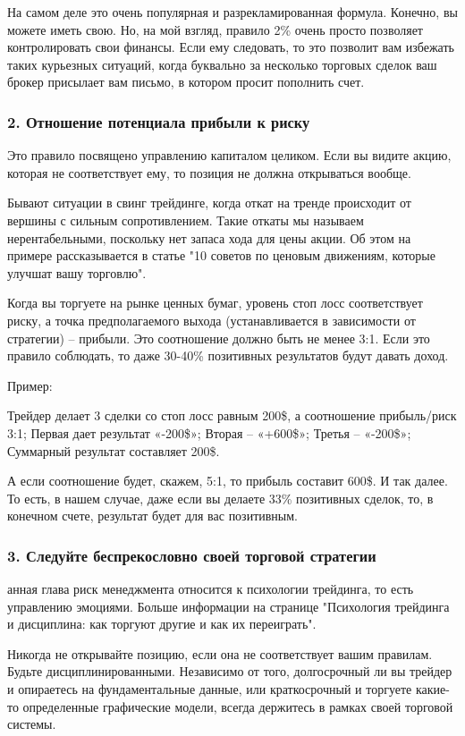 \documentclass{book}
\begin{document}
На самом деле это очень популярная и разрекламированная
формула. Конечно, вы можете иметь свою. Но, на мой взгляд, правило 2\% очень просто позволяет контролировать свои финансы. Если ему следовать, то это позволит вам избежать таких курьезных ситуаций, когда буквально за несколько торговых сделок ваш брокер присылает вам письмо, в котором просит пополнить счет.

\subsubsection{2. Отношение потенциала прибыли к риску}

Это правило посвящено управлению капиталом целиком. Если вы видите акцию, которая не соответствует ему, то позиция не должна открываться вообще.

Бывают ситуации в свинг трейдинге, когда откат на тренде происходит от вершины с сильным сопротивлением. Такие откаты мы называем нерентабельными, поскольку нет запаса хода для цены акции. Об этом на примере рассказывается в статье "10 советов по ценовым движениям, которые улучшат вашу торговлю".

Когда вы торгуете на рынке ценных бумаг, уровень стоп лосс соответствует риску, а точка предполагаемого выхода (устанавливается в зависимости от стратегии) – прибыли. Это соотношение должно быть не менее 3:1. Если это правило соблюдать, то даже 30-40\% позитивных результатов будут давать доход.

Пример:

    Трейдер делает 3 сделки со стоп лосс равным 200\$, а соотношение прибыль/риск 3:1;
    Первая дает результат «-200\$»;
    Вторая – «+600\$»;
    Третья – «-200\$»;
    Суммарный результат составляет 200\$.

А если соотношение будет, скажем, 5:1, то прибыль составит 600\$. И так далее. То есть, в нашем случае, даже если вы делаете 33\% позитивных сделок, то, в конечном счете, результат будет для вас позитивным.

\subsubsection{3. Следуйте беспрекословно своей торговой стратегии}

анная глава риск менеджмента относится к психологии трейдинга, то есть управлению эмоциями. Больше информации на странице "Психология трейдинга и дисциплина: как торгуют другие и как их переиграть".

Никогда не открывайте позицию, если она не соответствует вашим правилам. Будьте дисциплинированными. Независимо от того, долгосрочный ли вы трейдер и опираетесь на фундаментальные данные, или краткосрочный и торгуете какие-то определенные графические модели, всегда держитесь в рамках своей торговой системы.
\end{document}
